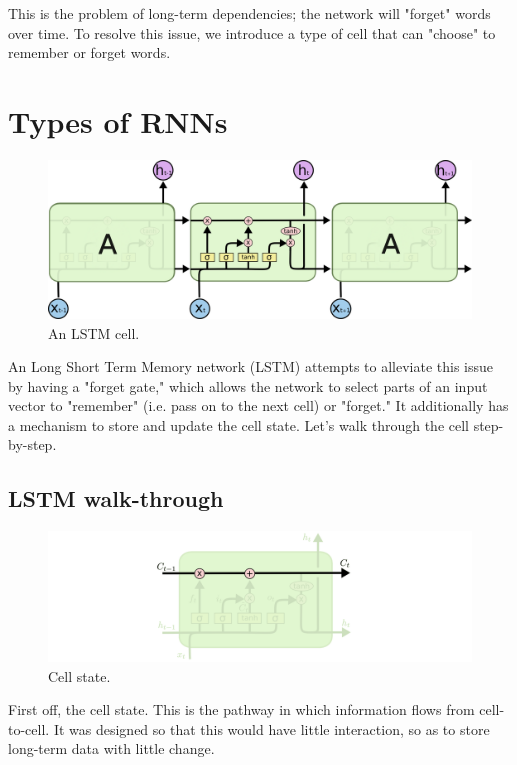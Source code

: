 \documentclass{article}
\begin{document}
    This is the problem of long-term dependencies; the network will "forget" words over time. To resolve this issue, we introduce a type of cell that can "choose" to remember or forget words.
\section{Types of RNNs}
    \begin{figure}[H]
        \centerline{\includegraphics[scale=0.4]{LSTM.png}}
        \caption{An LSTM cell.}
        \label{fig:lstm}
    \end{figure}
    An Long Short Term Memory network (LSTM) attempts to alleviate this issue by having a "forget gate," which allows the network to select parts of an input vector to "remember" (i.e. pass on to the next cell) or "forget." It additionally has a mechanism to store and update the cell state. Let's walk through the cell step-by-step.
    \subsection{LSTM walk-through}
    \begin{figure}[H]
        \centerline{\includegraphics[scale=0.4]{LSTM0.png}}
        \caption{Cell state.}
        \label{fig:lstm0}
    \end{figure}
    First off, the cell state. This is the pathway in which information flows from cell-to-cell. It was designed so that this would have little interaction, so as to store long-term data with little change. 
    
\end{document}

